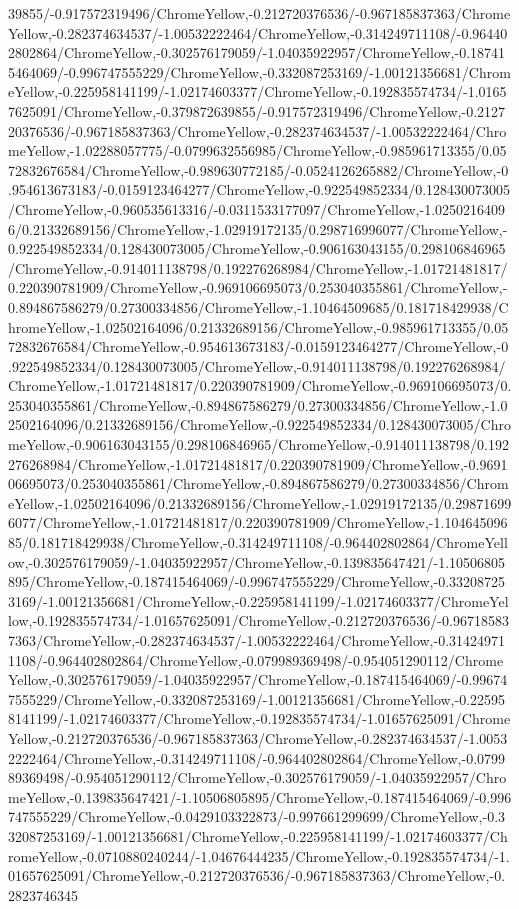 {\begin{tikzternal}
{39855/-0.917572319496/ChromeYellow,-0.212720376536/-0.967185837363/ChromeYellow,-0.282374634537/-1.00532222464/ChromeYellow,-0.314249711108/-0.964402802864/ChromeYellow,-0.302576179059/-1.04035922957/ChromeYellow,-0.187415464069/-0.996747555229/ChromeYellow,-0.332087253169/-1.00121356681/ChromeYellow,-0.225958141199/-1.02174603377/ChromeYellow,-0.192835574734/-1.01657625091/ChromeYellow,-0.379872639855/-0.917572319496/ChromeYellow,-0.212720376536/-0.967185837363/ChromeYellow,-0.282374634537/-1.00532222464/ChromeYellow,-1.02288057775/-0.0799632556985/ChromeYellow,-0.985961713355/0.0572832676584/ChromeYellow,-0.989630772185/-0.0524126265882/ChromeYellow,-0.954613673183/-0.0159123464277/ChromeYellow,-0.922549852334/0.128430073005/ChromeYellow,-0.960535613316/-0.0311533177097/ChromeYellow,-1.02502164096/0.21332689156/ChromeYellow,-1.02919172135/0.298716996077/ChromeYellow,-0.922549852334/0.128430073005/ChromeYellow,-0.906163043155/0.298106846965/ChromeYellow,-0.914011138798/0.192276268984/ChromeYellow,-1.01721481817/0.220390781909/ChromeYellow,-0.969106695073/0.253040355861/ChromeYellow,-0.894867586279/0.27300334856/ChromeYellow,-1.10464509685/0.181718429938/ChromeYellow,-1.02502164096/0.21332689156/ChromeYellow,-0.985961713355/0.0572832676584/ChromeYellow,-0.954613673183/-0.0159123464277/ChromeYellow,-0.922549852334/0.128430073005/ChromeYellow,-0.914011138798/0.192276268984/ChromeYellow,-1.01721481817/0.220390781909/ChromeYellow,-0.969106695073/0.253040355861/ChromeYellow,-0.894867586279/0.27300334856/ChromeYellow,-1.02502164096/0.21332689156/ChromeYellow,-0.922549852334/0.128430073005/ChromeYellow,-0.906163043155/0.298106846965/ChromeYellow,-0.914011138798/0.192276268984/ChromeYellow,-1.01721481817/0.220390781909/ChromeYellow,-0.969106695073/0.253040355861/ChromeYellow,-0.894867586279/0.27300334856/ChromeYellow,-1.02502164096/0.21332689156/ChromeYellow,-1.02919172135/0.298716996077/ChromeYellow,-1.01721481817/0.220390781909/ChromeYellow,-1.10464509685/0.181718429938/ChromeYellow,-0.314249711108/-0.964402802864/ChromeYellow,-0.302576179059/-1.04035922957/ChromeYellow,-0.139835647421/-1.10506805895/ChromeYellow,-0.187415464069/-0.996747555229/ChromeYellow,-0.332087253169/-1.00121356681/ChromeYellow,-0.225958141199/-1.02174603377/ChromeYellow,-0.192835574734/-1.01657625091/ChromeYellow,-0.212720376536/-0.967185837363/ChromeYellow,-0.282374634537/-1.00532222464/ChromeYellow,-0.314249711108/-0.964402802864/ChromeYellow,-0.079989369498/-0.954051290112/ChromeYellow,-0.302576179059/-1.04035922957/ChromeYellow,-0.187415464069/-0.996747555229/ChromeYellow,-0.332087253169/-1.00121356681/ChromeYellow,-0.225958141199/-1.02174603377/ChromeYellow,-0.192835574734/-1.01657625091/ChromeYellow,-0.212720376536/-0.967185837363/ChromeYellow,-0.282374634537/-1.00532222464/ChromeYellow,-0.314249711108/-0.964402802864/ChromeYellow,-0.079989369498/-0.954051290112/ChromeYellow,-0.302576179059/-1.04035922957/ChromeYellow,-0.139835647421/-1.10506805895/ChromeYellow,-0.187415464069/-0.996747555229/ChromeYellow,-0.0429103322873/-0.997661299699/ChromeYellow,-0.332087253169/-1.00121356681/ChromeYellow,-0.225958141199/-1.02174603377/ChromeYellow,-0.0710880240244/-1.04676444235/ChromeYellow,-0.192835574734/-1.01657625091/ChromeYellow,-0.212720376536/-0.967185837363/ChromeYellow,-0.2823746345}
\end{tikzternal}}
